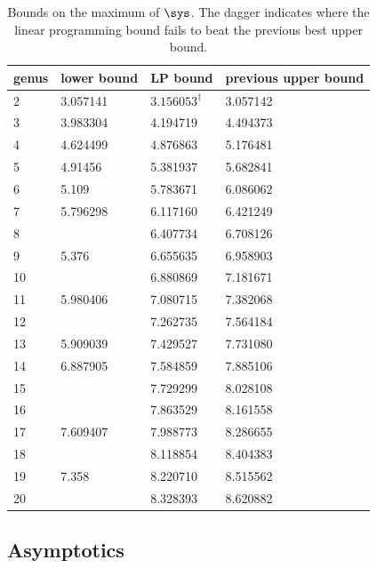 \documentclass[12pt]{amsart}
\numberwithin{equation}{section}
\begin{document}
{\footnotesize
\begin{table}[htp] 
\centering
\caption{Bounds on the maximum of $\sys$. The dagger indicates where the linear programming bound fails to beat the previous best upper bound.} \label{table:sys}
\begin{tabular}{|l|l|l|l|} 
\hline
genus & lower bound  & LP bound & previous upper bound \\
\hline
2 & 3.057141 \cite{Jenni} & $3.156053^\dagger$ &  3.057142 \cite{Jenni} \\   
3 & 3.983304 \cite{SchmutzMaxima} & 4.194719 & 4.494373  \cite{Bavard} \\
4 & 4.624499 \cite{SchmutzMaxima} & 4.876863 & 5.176481 \cite{Bavard} \\
5 & 4.91456 \cite{SchmutzKissing} & 5.381937 & 5.682841 \cite{Bavard}\\
6 &  5.109 \cite{Casamayou}        & 5.783671 & 6.086062 \cite{Bavard}\\
7 & 5.796298 \cite{VogelerThesis} & 6.117160 & 6.421249  \cite{Bavard} \\
8 &          & 6.407734 & 6.708126 \cite{Bavard} \\
9 &   5.376 \cite{SchmutzMaxima}      & 6.655635 & 6.958903 \cite{Bavard} \\
10 &         & 6.880869 & 7.181671 \cite{Bavard}  \\
11 & 5.980406 \cite{SchmutzMaxima} & 7.080715  & 7.382068 \cite{Bavard} \\
12 &          & 7.262735 & 7.564184 \cite{Bavard} \\
13 & 5.909039 \cite{FBRafi}  & 7.429527 & 7.731080 \cite{Bavard} \\
14 & 6.887905 \cite{Woods,VogelerThesis} & 7.584859 &  7.885106 \cite{Bavard} \\
15 &          & 7.729299 & 8.028108 \cite{Bavard} \\
16 &          & 7.863529 & 8.161558 \cite{Bavard} \\
17 & 7.609407 \cite{VogelerThesis} & 7.988773 & 8.286655 \cite{Bavard}\\
18 &   & 8.118854 & 8.404383 \cite{Bavard}\\
19 & 7.358 \cite{ScheinShoan} & 8.220710 & 8.515562 \cite{Bavard}\\
20 &  & 8.328393 & 8.620882 \cite{Bavard}\\
\hline
\end{tabular}
\end{table}
}

\subsection{Asymptotics}  \label{subsec:systole_asymptotic}
\end{document}
